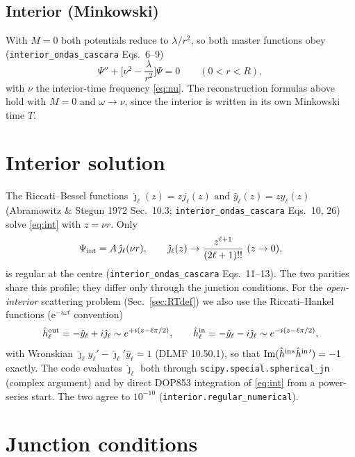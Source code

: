 \documentclass[11pt,a4paper]{article}
\numberwithin{equation}{section}
\newcommand{\jh}{\hat\jmath_\ell}
\newcommand{\yh}{\hat y_\ell}
\begin{document}
\subsection{Interior (Minkowski)}
With $M=0$ both potentials reduce to $\lambda/r^2$, so both master functions obey
(\texttt{interior\_ondas\_cascara} Eqs.~6--9)
\begin{equation}
\Psi''+\Big[\nu^2-\frac{\lambda}{r^2}\Big]\Psi=0\qquad(0<r<R),
\label{eq:int}
\end{equation}
with $\nu$ the interior-time frequency \eqref{eq:nu}. The reconstruction formulas above hold with $M=0$ and
$\omega\to\nu$, since the interior is written in its own Minkowski time $T$.

\section{Interior solution}\label{sec:interior}
The Riccati--Bessel functions $\jh(z)=zj_\ell(z)$ and $\yh(z)=zy_\ell(z)$ (Abramowitz \& Stegun 1972
Sec.~10.3; \texttt{interior\_ondas\_cascara} Eqs.~10, 26) solve \eqref{eq:int} with $z=\nu r$. Only
\begin{equation}
\Psi_{\rm int}=A\,\jh(\nu r),\qquad \jh(z)\to\frac{z^{\ell+1}}{(2\ell+1)!!}\ (z\to0),
\label{eq:intsol}
\end{equation}
is regular at the centre (\texttt{interior\_ondas\_cascara} Eqs.~11--13). The two parities share this profile;
they differ only through the junction conditions. For the \emph{open-interior} scattering problem
(Sec.~\ref{sec:RTdef}) we also use the Riccati--Hankel functions (e$^{-i\omega t}$ convention)
\begin{equation}
\hat h^{\rm out}_\ell=-\yh+i\jh\sim e^{+i(z-\ell\pi/2)},\qquad \hat h^{\rm in}_\ell=-\yh-i\jh\sim e^{-i(z-\ell\pi/2)},
\label{eq:hankel}
\end{equation}
with Wronskian $\jh\yh'-\jh'\yh=1$ (DLMF 10.50.1), so that ${\rm Im}(\hat h^{\rm in*}\hat h^{\rm in\,\prime})=-1$
exactly. The code evaluates $\jh$ both through \texttt{scipy.special.spherical\_jn} (complex argument) and by
direct DOP853 integration of \eqref{eq:int} from a power-series start. The two agree to $10^{-10}$
(\texttt{interior.regular\_numerical}).

\section{Junction conditions}\label{sec:junction}
\end{document}
